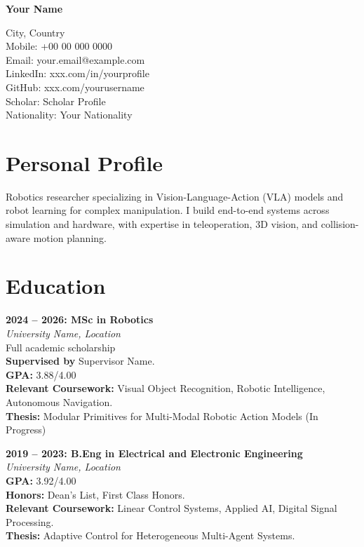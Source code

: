 \documentclass[11pt,a4paper]{article}
\newcommand{\blueitem}[1]{\textcolor{subtitleblue}{\textbf{#1}}}
\begin{document}
{\Huge \textbf{\textcolor{titleblue}{Your Name}}} \vspace{0.2em}

City, Country \\
Mobile: +00 00 000 0000 \\
Email: your.email@example.com \\
LinkedIn: xxx.com/in/yourprofile \\
GitHub: xxx.com/yourusername \\
Scholar: Scholar Profile \\
Nationality: Your Nationality

\vspace{0.4em}

\section*{Personal Profile}
Robotics researcher specializing in Vision-Language-Action (VLA) models and robot learning for complex manipulation. I build end-to-end systems across simulation and hardware, with expertise in teleoperation, 3D vision, and collision-aware motion planning.

\section*{Education}

\blueitem{2024 -- 2026: MSc in Robotics} \\
\textit{University Name, Location} \\
Full academic scholarship \\
\textbf{Supervised by} Supervisor Name. \\
\textbf{GPA:} 3.88/4.00 \\
\textbf{Relevant Coursework:} Visual Object Recognition, Robotic Intelligence, Autonomous Navigation. \\
\textbf{Thesis:} Modular Primitives for Multi-Modal Robotic Action Models (In Progress)

\vspace{0.3em}

\blueitem{2019 -- 2023: B.Eng in Electrical and Electronic Engineering} \\
\textit{University Name, Location} \\
\textbf{GPA:} 3.92/4.00 \\
\textbf{Honors:} Dean's List, First Class Honors. \\
\textbf{Relevant Coursework:} Linear Control Systems, Applied AI, Digital Signal Processing. \\
\textbf{Thesis:} Adaptive Control for Heterogeneous Multi-Agent Systems.
\end{document}
